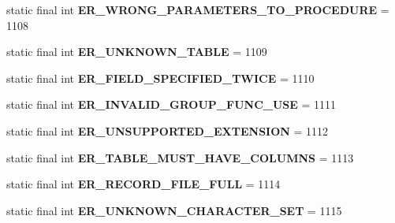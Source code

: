 \begin{DoxyCompactItemize}
static final int {\bfseries E\+R\+\_\+\+W\+R\+O\+N\+G\+\_\+\+P\+A\+R\+A\+M\+E\+T\+E\+R\+S\+\_\+\+T\+O\+\_\+\+P\+R\+O\+C\+E\+D\+U\+RE} = 1108
\item 
\mbox{\label{classcom_1_1mysql_1_1jdbc_1_1_mysql_error_numbers_a04099b82236ce7941b0da213255f123e}} 
static final int {\bfseries E\+R\+\_\+\+U\+N\+K\+N\+O\+W\+N\+\_\+\+T\+A\+B\+LE} = 1109
\item 
\mbox{\label{classcom_1_1mysql_1_1jdbc_1_1_mysql_error_numbers_a1d8d87ee26f4a248cae791b949d9f22d}} 
static final int {\bfseries E\+R\+\_\+\+F\+I\+E\+L\+D\+\_\+\+S\+P\+E\+C\+I\+F\+I\+E\+D\+\_\+\+T\+W\+I\+CE} = 1110
\item 
\mbox{\label{classcom_1_1mysql_1_1jdbc_1_1_mysql_error_numbers_adcdfaf02e27ed7a88975c62b4b282022}} 
static final int {\bfseries E\+R\+\_\+\+I\+N\+V\+A\+L\+I\+D\+\_\+\+G\+R\+O\+U\+P\+\_\+\+F\+U\+N\+C\+\_\+\+U\+SE} = 1111
\item 
\mbox{\label{classcom_1_1mysql_1_1jdbc_1_1_mysql_error_numbers_a2bbdc2865f969beeb371156696a6e2bd}} 
static final int {\bfseries E\+R\+\_\+\+U\+N\+S\+U\+P\+P\+O\+R\+T\+E\+D\+\_\+\+E\+X\+T\+E\+N\+S\+I\+ON} = 1112
\item 
\mbox{\label{classcom_1_1mysql_1_1jdbc_1_1_mysql_error_numbers_aeebd7fef72df54d8200449587b255d4e}} 
static final int {\bfseries E\+R\+\_\+\+T\+A\+B\+L\+E\+\_\+\+M\+U\+S\+T\+\_\+\+H\+A\+V\+E\+\_\+\+C\+O\+L\+U\+M\+NS} = 1113
\item 
\mbox{\label{classcom_1_1mysql_1_1jdbc_1_1_mysql_error_numbers_a0f05d64894567e34dc3a0bbd164af0bc}} 
static final int {\bfseries E\+R\+\_\+\+R\+E\+C\+O\+R\+D\+\_\+\+F\+I\+L\+E\+\_\+\+F\+U\+LL} = 1114
\item 
\mbox{\label{classcom_1_1mysql_1_1jdbc_1_1_mysql_error_numbers_a2a3b63fb5e961a91258b931d1f19b8be}} 
static final int {\bfseries E\+R\+\_\+\+U\+N\+K\+N\+O\+W\+N\+\_\+\+C\+H\+A\+R\+A\+C\+T\+E\+R\+\_\+\+S\+ET} = 1115

\end{DoxyCompactItemize}
